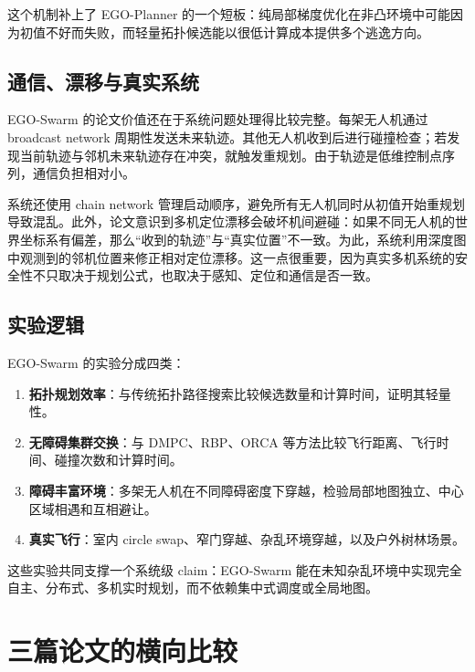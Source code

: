 \documentclass[UTF8,a4paper,12pt]{ctexart}
\begin{document}
这个机制补上了 EGO-Planner 的一个短板：纯局部梯度优化在非凸环境中可能因为初值不好而失败，而轻量拓扑候选能以很低计算成本提供多个逃逸方向。

\subsection{通信、漂移与真实系统}

EGO-Swarm 的论文价值还在于系统问题处理得比较完整。每架无人机通过 broadcast network 周期性发送未来轨迹。其他无人机收到后进行碰撞检查；若发现当前轨迹与邻机未来轨迹存在冲突，就触发重规划。由于轨迹是低维控制点序列，通信负担相对小。

系统还使用 chain network 管理启动顺序，避免所有无人机同时从初值开始重规划导致混乱。此外，论文意识到多机定位漂移会破坏机间避碰：如果不同无人机的世界坐标系有偏差，那么“收到的轨迹”与“真实位置”不一致。为此，系统利用深度图中观测到的邻机位置来修正相对定位漂移。这一点很重要，因为真实多机系统的安全性不只取决于规划公式，也取决于感知、定位和通信是否一致。

\subsection{实验逻辑}

EGO-Swarm 的实验分成四类：

\begin{enumerate}
  \item \textbf{拓扑规划效率}：与传统拓扑路径搜索比较候选数量和计算时间，证明其轻量性。
  \item \textbf{无障碍集群交换}：与 DMPC、RBP、ORCA 等方法比较飞行距离、飞行时间、碰撞次数和计算时间。
  \item \textbf{障碍丰富环境}：多架无人机在不同障碍密度下穿越，检验局部地图独立、中心区域相遇和互相避让。
  \item \textbf{真实飞行}：室内 circle swap、窄门穿越、杂乱环境穿越，以及户外树林场景。
\end{enumerate}

这些实验共同支撑一个系统级 claim：EGO-Swarm 能在未知杂乱环境中实现完全自主、分布式、多机实时规划，而不依赖集中式调度或全局地图。

\section{三篇论文的横向比较}
\end{document}
